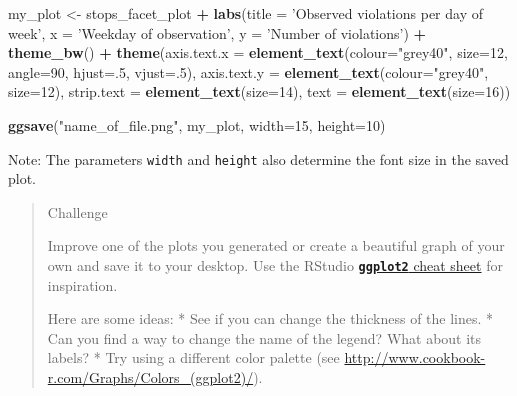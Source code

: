 \documentclass[]{book}
\newenvironment{Shaded}{\begin{snugshade}}{\end{snugshade}}
\newcommand{\KeywordTok}[1]{\textcolor[rgb]{0.13,0.29,0.53}{\textbf{#1}}}
\newcommand{\DataTypeTok}[1]{\textcolor[rgb]{0.13,0.29,0.53}{#1}}
\newcommand{\DecValTok}[1]{\textcolor[rgb]{0.00,0.00,0.81}{#1}}
\newcommand{\StringTok}[1]{\textcolor[rgb]{0.31,0.60,0.02}{#1}}
\newcommand{\OperatorTok}[1]{\textcolor[rgb]{0.81,0.36,0.00}{\textbf{#1}}}
\newcommand{\NormalTok}[1]{#1}
\theoremstyle{definition}
\theoremstyle{definition}
\theoremstyle{definition}
\theoremstyle{remark}
\begin{document}
\begin{Shaded}
\begin{Highlighting}[]
\NormalTok{my_plot <-}\StringTok{ }\NormalTok{stops_facet_plot }\OperatorTok{+}
\StringTok{  }\KeywordTok{labs}\NormalTok{(}\DataTypeTok{title =} \StringTok{'Observed violations per day of week'}\NormalTok{,}
         \DataTypeTok{x =} \StringTok{'Weekday of observation'}\NormalTok{,}
         \DataTypeTok{y =} \StringTok{'Number of violations'}\NormalTok{) }\OperatorTok{+}
\StringTok{  }\KeywordTok{theme_bw}\NormalTok{() }\OperatorTok{+}\StringTok{ }
\StringTok{  }\KeywordTok{theme}\NormalTok{(}\DataTypeTok{axis.text.x =} \KeywordTok{element_text}\NormalTok{(}\DataTypeTok{colour=}\StringTok{"grey40"}\NormalTok{, }\DataTypeTok{size=}\DecValTok{12}\NormalTok{, }\DataTypeTok{angle=}\DecValTok{90}\NormalTok{, }\DataTypeTok{hjust=}\NormalTok{.}\DecValTok{5}\NormalTok{, }\DataTypeTok{vjust=}\NormalTok{.}\DecValTok{5}\NormalTok{),}
        \DataTypeTok{axis.text.y =} \KeywordTok{element_text}\NormalTok{(}\DataTypeTok{colour=}\StringTok{"grey40"}\NormalTok{, }\DataTypeTok{size=}\DecValTok{12}\NormalTok{),}
        \DataTypeTok{strip.text =} \KeywordTok{element_text}\NormalTok{(}\DataTypeTok{size=}\DecValTok{14}\NormalTok{),}
        \DataTypeTok{text =} \KeywordTok{element_text}\NormalTok{(}\DataTypeTok{size=}\DecValTok{16}\NormalTok{))}

\KeywordTok{ggsave}\NormalTok{(}\StringTok{"name_of_file.png"}\NormalTok{, my_plot, }\DataTypeTok{width=}\DecValTok{15}\NormalTok{, }\DataTypeTok{height=}\DecValTok{10}\NormalTok{)}
\end{Highlighting}
\end{Shaded}

Note: The parameters \texttt{width} and \texttt{height} also determine
the font size in the saved plot.

\begin{quote}
Challenge

Improve one of the plots you generated or create a beautiful graph of
your own and save it to your desktop. Use the RStudio
\href{https://www.rstudio.com/wp-content/uploads/2016/11/ggplot2-cheatsheet-2.1.pdf}{\textbf{\texttt{ggplot2}}
cheat sheet} for inspiration.

Here are some ideas: * See if you can change the thickness of the lines.
* Can you find a way to change the name of the legend? What about its
labels? * Try using a different color palette (see
\url{http://www.cookbook-r.com/Graphs/Colors_(ggplot2)/}).
\end{quote}
\end{document}
